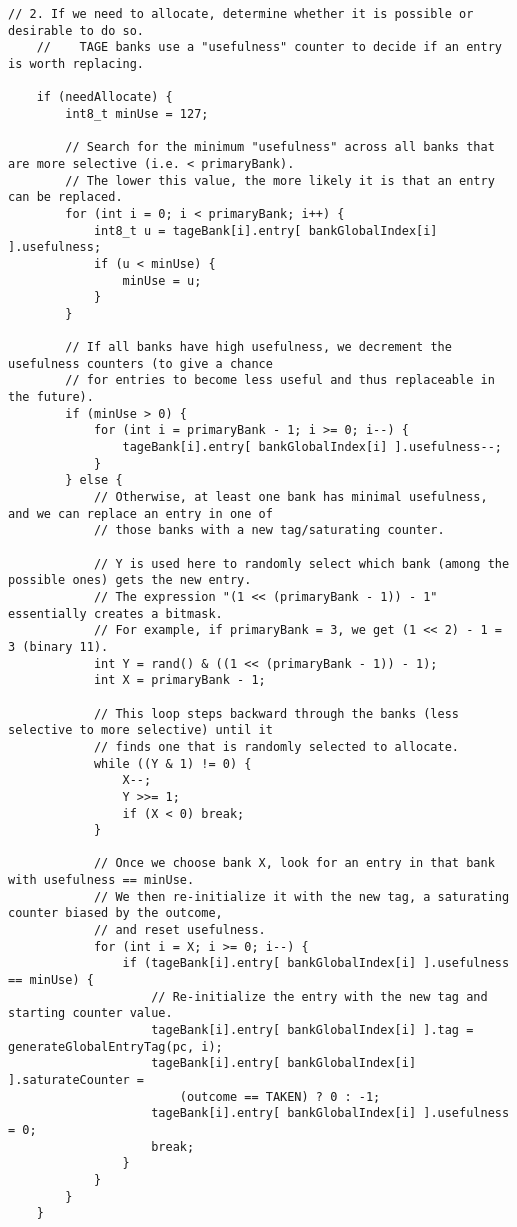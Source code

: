 \documentclass[11pt]{article}
\begin{document}
\begin{Verbatim}[fontsize=\tiny, breaklines=true]
    // 2. If we need to allocate, determine whether it is possible or desirable to do so.
    //    TAGE banks use a "usefulness" counter to decide if an entry is worth replacing.

    if (needAllocate) {
        int8_t minUse = 127;

        // Search for the minimum "usefulness" across all banks that are more selective (i.e. < primaryBank).
        // The lower this value, the more likely it is that an entry can be replaced.
        for (int i = 0; i < primaryBank; i++) {
            int8_t u = tageBank[i].entry[ bankGlobalIndex[i] ].usefulness;
            if (u < minUse) {
                minUse = u;
            }
        }

        // If all banks have high usefulness, we decrement the usefulness counters (to give a chance
        // for entries to become less useful and thus replaceable in the future).
        if (minUse > 0) {
            for (int i = primaryBank - 1; i >= 0; i--) {
                tageBank[i].entry[ bankGlobalIndex[i] ].usefulness--;
            }
        } else {
            // Otherwise, at least one bank has minimal usefulness, and we can replace an entry in one of
            // those banks with a new tag/saturating counter.

            // Y is used here to randomly select which bank (among the possible ones) gets the new entry.
            // The expression "(1 << (primaryBank - 1)) - 1" essentially creates a bitmask.
            // For example, if primaryBank = 3, we get (1 << 2) - 1 = 3 (binary 11).
            int Y = rand() & ((1 << (primaryBank - 1)) - 1);
            int X = primaryBank - 1;

            // This loop steps backward through the banks (less selective to more selective) until it
            // finds one that is randomly selected to allocate.
            while ((Y & 1) != 0) {
                X--;
                Y >>= 1;
                if (X < 0) break;
            }

            // Once we choose bank X, look for an entry in that bank with usefulness == minUse.
            // We then re-initialize it with the new tag, a saturating counter biased by the outcome,
            // and reset usefulness.
            for (int i = X; i >= 0; i--) {
                if (tageBank[i].entry[ bankGlobalIndex[i] ].usefulness == minUse) {
                    // Re-initialize the entry with the new tag and starting counter value.
                    tageBank[i].entry[ bankGlobalIndex[i] ].tag = generateGlobalEntryTag(pc, i);
                    tageBank[i].entry[ bankGlobalIndex[i] ].saturateCounter =
                        (outcome == TAKEN) ? 0 : -1;
                    tageBank[i].entry[ bankGlobalIndex[i] ].usefulness = 0;
                    break;
                }
            }
        }
    }


\end{Verbatim}
\end{document}
